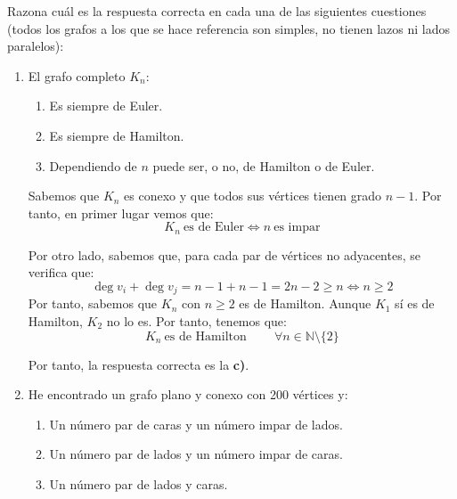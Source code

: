 \begin{ejercicio}\label{ej:1.25}
    Razona cuál es la respuesta correcta en cada una de las siguientes cuestiones (todos los grafos a los que se hace referencia son simples, no tienen lazos ni lados paralelos):
    \begin{enumerate}
        \item El grafo completo $K_n$:
        \begin{enumerate}
            \item Es siempre de Euler.
            \item Es siempre de Hamilton.
            \item Dependiendo de $n$ puede ser, o no, de Hamilton o de Euler.
        \end{enumerate}

        Sabemos que $K_n$ es conexo y que todos sus vértices tienen grado $n-1$. Por tanto, en primer lugar vemos que:
        \begin{equation*}
            K_n\ \text{es de Euler} \iff n\ \text{es impar}
        \end{equation*}

        Por otro lado, sabemos que, para cada par de vértices no adyacentes, se verifica que:
        \begin{equation*}
            \deg v_i + \deg v_j = n-1 + n-1 = 2n-2 \geq n\iff n\geq 2
        \end{equation*}
        Por tanto, sabemos que $K_n$ con $n\geq 2$ es de Hamilton.
        Aunque $K_1$ sí es de Hamilton, $K_2$ no lo es. Por tanto, tenemos que:
        \begin{equation*}
            K_n\ \text{es de Hamilton}~\qquad \forall n\in \mathbb{N}\setminus \{2\}
        \end{equation*}

        Por tanto, la respuesta correcta es la \textbf{c)}.
        \item He encontrado un grafo plano y conexo con 200 vértices y:
        \begin{enumerate}
            \item Un número par de caras y un número impar de lados.
            \item Un número par de lados y un número impar de caras.
            \item Un número par de lados y caras.
        \end{enumerate}


\end{enumerate}
\end{ejercicio}
